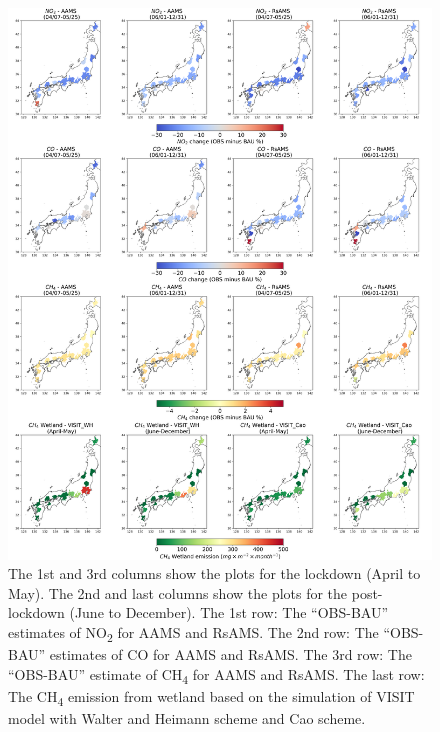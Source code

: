 \begin{figure}[p]
    \centering
    \includegraphics[width=\textwidth]{figs/chap4/fig7.png}
    \caption[NO\textsubscript{2}, CO and CH\textsubscript{4}, and HCHO variations in 2020]{The 1st and 3rd columns show the plots for the lockdown (April to May). The 2nd and last columns show the plots for the post-lockdown (June to December). The 1st row: The “OBS-BAU” estimates of NO\textsubscript{2} for AAMS and RsAMS. The 2nd row: The “OBS-BAU” estimates of CO for AAMS and RsAMS. The 3rd row: The “OBS-BAU” estimate of CH\textsubscript{4} for AAMS and RsAMS. The last row: The CH\textsubscript{4} emission from wetland based on the simulation of VISIT model with Walter and Heimann scheme and Cao scheme.}
    \label{fig:chap4_fig7}
\end{figure}


